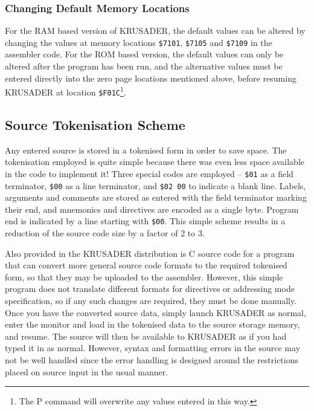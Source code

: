 \documentclass[12pt]{article}
\newcommand{\replica}[1]{\textsf{#1}}
\newcommand{\krusader}{\textsf{KRUSADER}\xspace}
\begin{document}
\subsubsection{Changing Default Memory Locations}
\label{sec:mem_defaults}
For the RAM based version of \krusader, the default values can be altered by changing the values at memory locations \texttt{\$7101}, \texttt{\$7105} and \texttt{\$7109} in the assembler code.
For the ROM based version, the default values can only be altered after the program has been run, and the alternative values must be entered directly into the zero page locations mentioned above, before resuming \krusader at location 
\texttt{\$F01C}\footnote{The \replica{P} command will overwrite any values entered in this way.}.

\subsection{Source Tokenisation Scheme}
\label{sec:token}

Any entered source is stored in a tokenised form in order to save space.  The tokenisation
employed is quite simple because there was even less space available in the code to implement it!
Three special codes are employed -- \texttt{\$01} as a field terminator, 
\texttt{\$00} as a line terminator, and \texttt{\$02 00} to indicate a blank line.
Labels, arguments and comments are stored as entered with the field terminator marking their end, 
and mnemonics and directives are encoded as a single byte.  Program end is indicated by a line
starting with \texttt{\$00}.  
This simple scheme results in a reduction of the source code size by a factor of 2 to 3.

Also provided in the \krusader distribution is C source code for a program that can
convert more general source code formats to the required tokenised form, so that they
may be uploaded to the assembler.  However, this simple program does not translate
different formats for directives or addressing mode specification, so if any
such changes are required, they must be done manually. 
Once you have the converted source data, simply 
launch \krusader as normal, enter the monitor and load in the tokenised data to the
source storage memory, and resume.  The source will then be available to \krusader
as if you had typed it in as normal.  However, syntax and formatting errors in the source may not be well handled
since the error handling is designed around the restrictions placed on source input in the
usual manner.
\end{document}
